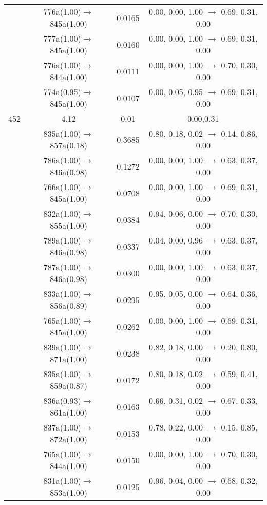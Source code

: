 \documentclass[10pt,a4paper]{article}
\begin{document}
\begin{longtable}{c|c|c|c}
 	& 776a(1.00)$\rightarrow$845a(1.00) &	 0.0165 &	 0.00, 0.00, 1.00 $\rightarrow$ 0.69, 0.31, 0.00 \\ 
 	& 777a(1.00)$\rightarrow$845a(1.00) &	 0.0160 &	 0.00, 0.00, 1.00 $\rightarrow$ 0.69, 0.31, 0.00 \\ 
 	& 776a(1.00)$\rightarrow$844a(1.00) &	 0.0111 &	 0.00, 0.00, 1.00 $\rightarrow$ 0.70, 0.30, 0.00 \\ 
 	& 774a(0.95)$\rightarrow$845a(1.00) &	 0.0107 &	 0.00, 0.05, 0.95 $\rightarrow$ 0.69, 0.31, 0.00 \\ 
 \hline452 &	 4.12 &	 0.01 &	 0.00,0.31 \\ 
  	& 835a(1.00)$\rightarrow$857a(0.18) &	 0.3685 &	 0.80, 0.18, 0.02 $\rightarrow$ 0.14, 0.86, 0.00 \\ 
 	& 786a(1.00)$\rightarrow$846a(0.98) &	 0.1272 &	 0.00, 0.00, 1.00 $\rightarrow$ 0.63, 0.37, 0.00 \\ 
 	& 766a(1.00)$\rightarrow$845a(1.00) &	 0.0708 &	 0.00, 0.00, 1.00 $\rightarrow$ 0.69, 0.31, 0.00 \\ 
 	& 832a(1.00)$\rightarrow$855a(1.00) &	 0.0384 &	 0.94, 0.06, 0.00 $\rightarrow$ 0.70, 0.30, 0.00 \\ 
 	& 789a(1.00)$\rightarrow$846a(0.98) &	 0.0337 &	 0.04, 0.00, 0.96 $\rightarrow$ 0.63, 0.37, 0.00 \\ 
 	& 787a(1.00)$\rightarrow$846a(0.98) &	 0.0300 &	 0.00, 0.00, 1.00 $\rightarrow$ 0.63, 0.37, 0.00 \\ 
 	& 833a(1.00)$\rightarrow$856a(0.89) &	 0.0295 &	 0.95, 0.05, 0.00 $\rightarrow$ 0.64, 0.36, 0.00 \\ 
 	& 765a(1.00)$\rightarrow$845a(1.00) &	 0.0262 &	 0.00, 0.00, 1.00 $\rightarrow$ 0.69, 0.31, 0.00 \\ 
 	& 839a(1.00)$\rightarrow$871a(1.00) &	 0.0238 &	 0.82, 0.18, 0.00 $\rightarrow$ 0.20, 0.80, 0.00 \\ 
 	& 835a(1.00)$\rightarrow$859a(0.87) &	 0.0172 &	 0.80, 0.18, 0.02 $\rightarrow$ 0.59, 0.41, 0.00 \\ 
 	& 836a(0.93)$\rightarrow$861a(1.00) &	 0.0163 &	 0.66, 0.31, 0.02 $\rightarrow$ 0.67, 0.33, 0.00 \\ 
 	& 837a(1.00)$\rightarrow$872a(1.00) &	 0.0153 &	 0.78, 0.22, 0.00 $\rightarrow$ 0.15, 0.85, 0.00 \\ 
 	& 765a(1.00)$\rightarrow$844a(1.00) &	 0.0150 &	 0.00, 0.00, 1.00 $\rightarrow$ 0.70, 0.30, 0.00 \\ 
 	& 831a(1.00)$\rightarrow$853a(1.00) &	 0.0125 &	 0.96, 0.04, 0.00 $\rightarrow$ 0.68, 0.32, 0.00 \\ 

\end{longtable}
\end{document}
